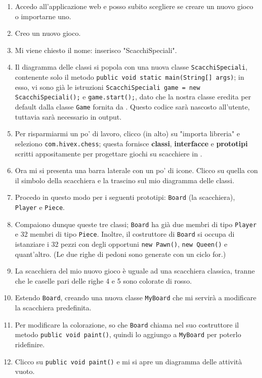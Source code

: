 \begin{enumerate}
	\item Accedo all'applicazione web e posso subito scegliere se creare un nuovo gioco o importarne uno.
	\item Creo un nuovo gioco.
	\item Mi viene chiesto il nome: inserisco "ScacchiSpeciali".
	\item Il diagramma delle classi si popola con una nuova classe \texttt{ScacchiSpeciali}, contenente solo il metodo \texttt{public void static main(String[] args)}; in esso, vi sono già le istruzioni \texttt{ScacchiSpeciali game = new ScacchiSpeciali();} e \texttt{game.start();}, dato che la nostra classe eredita per default dalla classe \texttt{Game} fornita da \proj. Questo codice sarà nascosto all'utente, tuttavia sarà necessario in output.
	\item Per risparmiarmi un po' di lavoro, clicco (in alto) su "importa libreria" e seleziono \texttt{com.hivex.chess}; questa fornisce \textbf{classi}, \textbf{interfacce} e \textbf{prototipi} scritti appositamente per progettare giochi su scacchiere in \proj.
	\item Ora mi si presenta una barra laterale con un po' di icone. Clicco su quella con il simbolo della scacchiera e la trascino sul mio diagramma delle classi.
	\item Procedo in questo modo per i seguenti prototipi: \texttt{Board} (la scacchiera), \texttt{Player} e \texttt{Piece}.
	\item Compaiono dunque queste tre classi; \texttt{Board} ha già due membri di tipo \texttt{Player} e 32 membri di tipo \texttt{Piece}. Inoltre, il costruttore di \texttt{Board} si occupa di istanziare i 32 pezzi con degli opportuni \texttt{new Pawn()}, \texttt{new Queen()} e quant'altro. (Le due righe di pedoni sono generate con un ciclo for.)
	\item La scacchiera del mio nuovo gioco è uguale ad una scacchiera classica, tranne che le caselle pari delle righe 4 e 5 sono colorate di rosso.
	\item Estendo \texttt{Board}, creando una nuova classe \texttt{MyBoard} che mi servirà a modificare la scacchiera predefinita.
	\item Per modificare la colorazione, so che \texttt{Board} chiama nel suo costruttore il metodo \texttt{public void paint()}, quindi lo aggiungo a \texttt{MyBoard} per poterlo ridefinire.
	\item Clicco su \texttt{public void paint()} e mi si apre un diagramma delle attività vuoto.

\end{enumerate}
